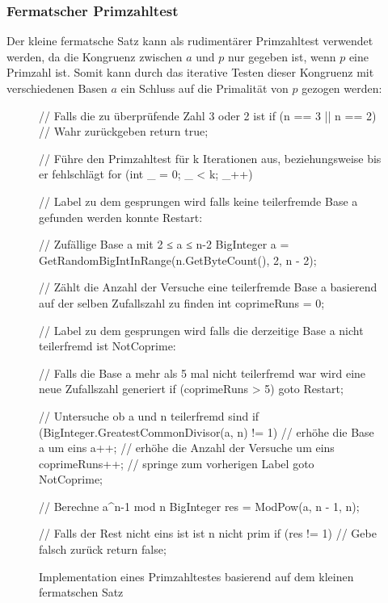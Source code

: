 \subsubsection{Fermatscher Primzahltest}

Der kleine fermatsche Satz kann als rudimentärer Primzahltest verwendet werden, da die Kongruenz zwischen $a$ und $p$ nur gegeben ist, wenn $p$ eine Primzahl ist. Somit kann durch das iterative Testen dieser Kongruenz mit verschiedenen Basen $a$ ein Schluss auf die Primalität von $p$ gezogen werden:

\begin{figure}[h]
  \begin{cminted}

  // Falls die zu überprüfende Zahl 3 oder 2 ist
  if (n == 3 || n == 2)
    // Wahr zurückgeben
    return true;

  // Führe den Primzahltest für k Iterationen aus, beziehungsweise bis er fehlschlägt
  for (int _ = 0; _ < k; _++)
  {

    // Label zu dem gesprungen wird falls keine teilerfremde Base a gefunden werden konnte
    Restart:
                
    // Zufällige Base a mit 2 ≤ a ≤ n-2
    BigInteger a = GetRandomBigIntInRange(n.GetByteCount(), 2, n - 2);

    // Zählt die Anzahl der Versuche eine teilerfremde Base a basierend auf der selben Zufallszahl zu finden
    int coprimeRuns = 0;

    // Label zu dem gesprungen wird falls die derzeitige Base a nicht teilerfremd ist
    NotCoprime:

    // Falls die Base a mehr als 5 mal nicht teilerfremd war wird eine neue Zufallszahl generiert
    if (coprimeRuns > 5)
      goto Restart;

    // Untersuche ob a und n teilerfremd sind
    if (BigInteger.GreatestCommonDivisor(a, n) != 1)
    {
      // erhöhe die Base a um eins
      a++;
      // erhöhe die Anzahl der Versuche um eins
      coprimeRuns++;
      // springe zum vorherigen Label
      goto NotCoprime;
    }

    // Berechne a^n-1 mod n
    BigInteger res = ModPow(a, n - 1, n);

    // Falls der Rest nicht eins ist ist n nicht prim
    if (res != 1)
    {
      // Gebe falsch zurück
      return false;
    }
  }
  \end{cminted}
  \caption{Implementation eines Primzahltestes basierend auf dem kleinen fermatschen Satz}
\end{figure}
